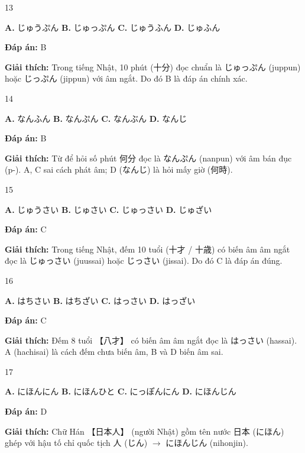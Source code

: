 \documentclass[12pt,a4paper]{report}
\newcommand{\source}[1]{}
\newcommand{\choice}[2]{\textbf{#1.} #2 \quad}
\newcommand{\answer}[1]{\par\textbf{Đáp án:} #1}
\newcommand{\confidence}[1]{}
\newcommand{\explain}[1]{\par\textbf{Giải thích:} #1\vspace{0.5cm}}
\begin{document}
\begin{question}{13}
\source{Q3.jpg}
\choice{A}{じゅうぷん}
\choice{B}{じゅっぷん}
\choice{C}{じゅうふん}
\choice{D}{じゅふん}
\answer{B}
\confidence{high}
\explain{Trong tiếng Nhật, 10 phút (十分) đọc chuẩn là じゅっぷん (juppun) hoặc じっぷん (jippun) với âm ngắt. Do đó B là đáp án chính xác.}
\end{question}

\begin{question}{14}
\source{Q4.jpg}
\choice{A}{なんふん}
\choice{B}{なんぷん}
\choice{C}{なんぶん}
\choice{D}{なんじ}
\answer{B}
\confidence{high}
\explain{Từ để hỏi số phút 何分 đọc là なんぷん (nanpun) với âm bán đục (p-). A, C sai cách phát âm; D (なんじ) là hỏi mấy giờ (何時).}
\end{question}

\begin{question}{15}
\source{Q1.webp}
\choice{A}{じゅうさい}
\choice{B}{じゅさい}
\choice{C}{じゅっさい}
\choice{D}{じゅざい}
\answer{C}
\confidence{high}
\explain{Trong tiếng Nhật, đếm 10 tuổi (十才 / 十歳) có biến âm âm ngắt đọc là じゅっさい (juussai) hoặc じっさい (jissai). Do đó C là đáp án đúng.}
\end{question}

\begin{question}{16}
\source{Q3.webp}
\choice{A}{はちさい}
\choice{B}{はちざい}
\choice{C}{はっさい}
\choice{D}{はっざい}
\answer{C}
\confidence{high}
\explain{Đếm 8 tuổi 【八才】 có biến âm âm ngắt đọc là はっさい (hassai). A (hachisai) là cách đếm chưa biến âm, B và D biến âm sai.}
\end{question}

\begin{question}{17}
\source{Q3.webp}
\choice{A}{にほんにん}
\choice{B}{にほんひと}
\choice{C}{にっぽんにん}
\choice{D}{にほんじん}
\answer{D}
\confidence{high}
\explain{Chữ Hán 【日本人】 (người Nhật) gồm tên nước 日本 (にほん) ghép với hậu tố chỉ quốc tịch 人 (じん) $\rightarrow$ にほんじん (nihonjin).}
\end{question}
\end{document}
